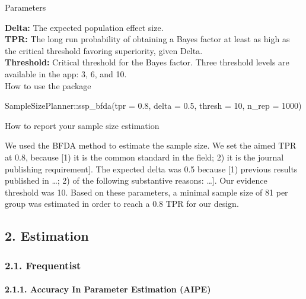 \documentclass[
  english,
  man,floatsintext]{apa6}
\newenvironment{Shaded}{\begin{snugshade}}{\end{snugshade}}
\newcommand{\AttributeTok}[1]{\textcolor[rgb]{0.77,0.63,0.00}{#1}}
\newcommand{\DecValTok}[1]{\textcolor[rgb]{0.00,0.00,0.81}{#1}}
\newcommand{\FloatTok}[1]{\textcolor[rgb]{0.00,0.00,0.81}{#1}}
\newcommand{\FunctionTok}[1]{\textcolor[rgb]{0.00,0.00,0.00}{#1}}
\newcommand{\NormalTok}[1]{#1}
\newcommand{\SpecialCharTok}[1]{\textcolor[rgb]{0.00,0.00,0.00}{#1}}
\let\oldparagraph\paragraph
\renewcommand{\paragraph}[1]{\oldparagraph{#1}\mbox{}}
\begin{document}
Parameters

\textbf{Delta:} The expected population effect size.\\
\textbf{TPR:} The long run probability of obtaining a Bayes factor at least as high as the critical threshold favoring superiority, given Delta.\\
\textbf{Threshold:} Critical threshold for the Bayes factor. Three threshold levels are available in the app: 3, 6, and 10.\\

How to use the package

\begin{Shaded}
\begin{Highlighting}[]
\NormalTok{SampleSizePlanner}\SpecialCharTok{::}\FunctionTok{ssp\_bfda}\NormalTok{(}\AttributeTok{tpr =} \FloatTok{0.8}\NormalTok{, }\AttributeTok{delta =} \FloatTok{0.5}\NormalTok{, }\AttributeTok{thresh =} \DecValTok{10}\NormalTok{, }
    \AttributeTok{n\_rep =} \DecValTok{1000}\NormalTok{)}
\end{Highlighting}
\end{Shaded}

How to report your sample size estimation

We used the BFDA method to estimate the sample size. We set the aimed TPR at 0.8, because {[}1) it is the common standard in the field; 2) it is the journal publishing requirement{]}. The expected delta was 0.5 because {[}1) previous results published in \ldots; 2) of the following substantive reasons: \ldots{]}. Our evidence threshold was 10. Based on these parameters, a minimal sample size of 81 per group was estimated in order to reach a 0.8 TPR for our design.

\hypertarget{estimation}{%
\subsection{2. Estimation}\label{estimation}}

\hypertarget{frequentist-1}{%
\subsubsection{2.1. Frequentist}\label{frequentist-1}}

\hypertarget{accuracy-in-parameter-estimation-aipe}{%
\paragraph{2.1.1. Accuracy In Parameter Estimation (AIPE)}\label{accuracy-in-parameter-estimation-aipe}}
\end{document}
